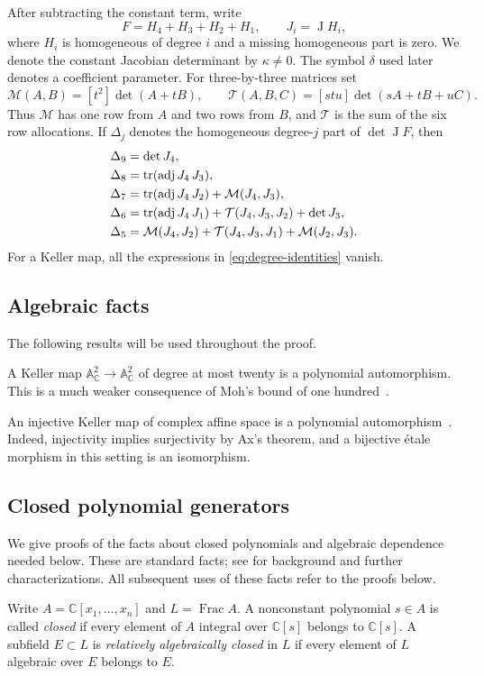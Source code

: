 \documentclass[11pt,reqno]{amsart}
\numberwithin{equation}{section}
\theoremstyle{plain}
\theoremstyle{definition}
\theoremstyle{remark}
\newcommand{\C}{\mathbb C}
\newcommand{\A}{\mathbb A}
\newcommand{\tr}{\operatorname{tr}}
\newcommand{\adj}{\operatorname{adj}}
\newcommand{\Frac}{\operatorname{Frac}}
\newcommand{\J}{\operatorname J}
\newcommand{\Mi}{\mathcal M}
\newcommand{\Tri}{\mathcal T}
\begin{document}
After subtracting the constant term, write
\[
F=H_4+H_3+H_2+H_1,\qquad J_i=\J H_i,
\]
where $H_i$ is homogeneous of degree $i$ and a missing homogeneous part is zero. We denote the constant Jacobian determinant by $\kappa\ne0$. The symbol
$\delta$ used later denotes a coefficient parameter.
For three-by-three matrices set
\[
\Mi(A,B)=[t^2]\det(A+tB),\qquad
\Tri(A,B,C)=[stu]\det(sA+tB+uC).
\]
Thus $\Mi$ has one row from $A$ and two rows from $B$, and $\Tri$ is the sum of the six row allocations. If $\Delta_j$ denotes the homogeneous degree-$j$ part of $\det\J F$, then
\begin{align}
\Delta_9&=\det J_4,\notag\\
\Delta_8&=\tr(\adj J_4\,J_3),\notag\\
\Delta_7&=\tr(\adj J_4\,J_2)+\Mi(J_4,J_3),\label{eq:degree-identities}\\
\Delta_6&=\tr(\adj J_4\,J_1)+\Tri(J_4,J_3,J_2)+\det J_3,\notag\\
\Delta_5&=\Mi(J_4,J_2)+\Tri(J_4,J_3,J_1)+\Mi(J_2,J_3).\notag
\end{align}
For a Keller map, all the expressions in \eqref{eq:degree-identities} vanish.

\subsection{Algebraic facts}
The following results will be used throughout the proof.

A Keller map $\A^2_\C\to\A^2_\C$ of degree at most twenty is a polynomial automorphism. This is a much weaker consequence of Moh's bound of one hundred~\cite{Moh}.

An injective Keller map of complex affine space is a polynomial
automorphism~\cite{Ax,BCW}. Indeed, injectivity implies surjectivity by
Ax's theorem, and a bijective \'etale morphism in this setting is an
isomorphism.

\subsection{Closed polynomial generators}\label{sec:closed-generators}
We give proofs of the facts about closed polynomials and algebraic
dependence needed below. These are standard facts; see \cite{AP} for
background and further characterizations. All subsequent uses of these
facts refer to the proofs below.

Write $A=\C[x_1,\ldots,x_n]$ and $L=\Frac A$. A nonconstant
polynomial $s\in A$ is called \emph{closed} if every element of $A$
integral over $\C[s]$ belongs to $\C[s]$. A subfield $E\subset L$
is \emph{relatively algebraically closed} in $L$ if every element of
$L$ algebraic over $E$ belongs to $E$.
\end{document}
